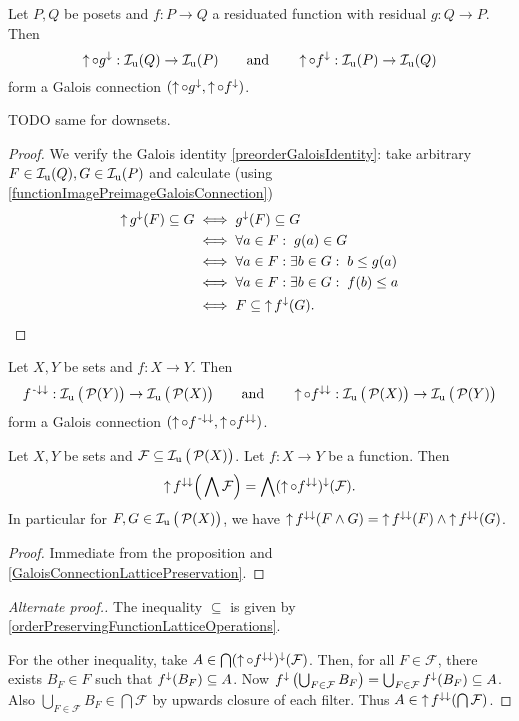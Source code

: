 \begin{proposition} \label{upsetResiduatedImageGaloisConnection}
Let $P,Q$ be posets and $f: P\to Q$ a residuated function with residual $g: Q\to P$. Then
\[ \operatorname{\uparrow}\circ g^{\downarrow}: \operatorname{\mathcal{I}_u}(Q) \to \operatorname{\mathcal{I}_u}(P) \qquad\text{and}\qquad \operatorname{\uparrow}\circ f^{\downarrow}: \operatorname{\mathcal{I}_u}(P) \to \operatorname{\mathcal{I}_u}(Q) \]
form a Galois connection $(\operatorname{\uparrow}\circ g^{\downarrow}, \operatorname{\uparrow}\circ f^{\downarrow})$.
\end{proposition}
TODO same for downsets.
\begin{proof}
We verify the Galois identity \ref{preorderGaloisIdentity}: take arbitrary $F\in \operatorname{\mathcal{I}_u}(Q), G\in \operatorname{\mathcal{I}_u}(P)$ and calculate (using \ref{functionImagePreimageGaloisConnection})
\begin{align*}
\operatorname{\uparrow} g^{\downarrow}(F) \subseteq G &\iff g^\downarrow(F) \subseteq G \\
&\iff \forall a\in F: \; g(a) \in G \\
&\iff \forall a\in F: \exists b\in G: \; b \leq g(a) \\
&\iff \forall a\in F: \exists b\in G: \; f(b) \leq a \\
&\iff F \subseteq \operatorname{\uparrow} f^{\downarrow}(G).
\end{align*}
\end{proof}
\begin{corollary} \label{upsetPreimageImageGaloisConnection}
Let $X, Y$ be sets and $f: X\to Y$. Then
\[ f^{{\text{\hspace{0.15em}-}\downarrow}\downarrow}: \operatorname{\mathcal{I}_u}\big(\operatorname{\mathcal{P}}(Y)\big) \to \operatorname{\mathcal{I}_u}\big(\operatorname{\mathcal{P}}(X)\big) \qquad\text{and}\qquad \operatorname{\uparrow}\circ f^{\downarrow\downarrow}: \operatorname{\mathcal{I}_u}\big(\operatorname{\mathcal{P}}(X)\big) \to \operatorname{\mathcal{I}_u}\big(\operatorname{\mathcal{P}}(Y)\big) \]
form a Galois connection $(\operatorname{\uparrow}\circ f^{{\text{\hspace{0.15em}-}\downarrow}\downarrow}, \operatorname{\uparrow}\circ f^{\downarrow\downarrow})$.
\end{corollary}
\begin{corollary} \label{imageUpsetsPreservesIntersection}
Let $X, Y$ be sets and $\mathcal{F}\subseteq\operatorname{\mathcal{I}_u}\big(\operatorname{\mathcal{P}}(X)\big)$. Let $f:X\to Y$ be a function. Then
\[ \operatorname{\uparrow} f^{\downarrow\downarrow}\Big(\bigwedge \mathcal{F}\Big) = \bigwedge (\operatorname{\uparrow}\circ f^{\downarrow\downarrow})^{\downarrow}(\mathcal{F}). \]
In particular for $F,G\in \operatorname{\mathcal{I}_u}\big(\operatorname{\mathcal{P}}(X)\big)$, we have $\operatorname{\uparrow} f^{\downarrow\downarrow}(F\wedge G) = \operatorname{\uparrow} f^{\downarrow\downarrow}(F) \wedge \operatorname{\uparrow} f^{\downarrow\downarrow}(G)$.
\end{corollary}
\begin{proof}
Immediate from the proposition and \ref{GaloisConnectionLatticePreservation}.
\end{proof}
\begin{proof}[Alternate proof.]
The inequality $\subseteq$ is given by \ref{orderPreservingFunctionLatticeOperations}.

For the other inequality, take $A\in \bigcap (\operatorname{\uparrow}\circ f^{\downarrow\downarrow})^{\downarrow}(\mathcal{F})$. Then, for all $F\in\mathcal{F}$, there exists $B_F\in F$ such that $f^{\downarrow}(B_F) \subseteq A$. Now $f^{\downarrow}\left(\bigcup_{F\in\mathcal{F}}B_F\right) = \bigcup_{F\in\mathcal{F}}f^{\downarrow}(B_F) \subseteq A$. Also $\bigcup_{F\in\mathcal{F}}B_F \in \bigcap \mathcal{F}$ by upwards closure of each filter. Thus $A\in \operatorname{\uparrow} f^{\downarrow\downarrow}(\bigcap \mathcal{F})$.
\end{proof}

